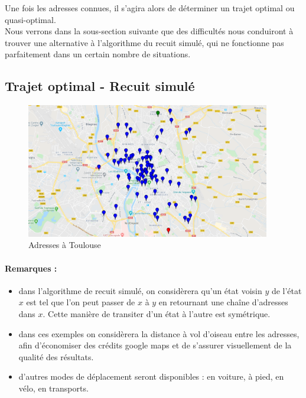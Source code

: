 \documentclass[12pt]{article}
\begin{document}
Une fois les adresses connues, il s'agira alors de déterminer un trajet optimal ou quasi-optimal.\\

Nous verrons dans la sous-section suivante que des difficultés nous conduiront à trouver une alternative à l'algorithme du recuit simulé, qui ne fonctionne pas parfaitement dans un certain nombre de situations.

\subsection{Trajet optimal - Recuit simulé}

\begin{figure}[H]
\caption{Adresses à Toulouse}
\begin{center}
\includegraphics[width=0.95\textwidth]{adresses toulouse}
\end{center}
\end{figure}
\paragraph{Remarques :}
\begin{itemize}
\item dans l'algorithme de recuit simulé, on considèrera qu'un état voisin $y$ de l'état $x$ est tel que l'on peut passer de $x$ à $y$ en retournant une chaîne d'adresses dans $x$. Cette manière de transiter d'un état à l'autre est symétrique.
\item dans ces exemples on considèrera la distance à vol d'oiseau entre les adresses, afin d'économiser des crédits google maps et de s'assurer visuellement de la qualité des résultats.
\item d'autres modes de déplacement seront disponibles : en voiture, à pied, en vélo, en transports.
\end{itemize}
\newpage
\end{document}
